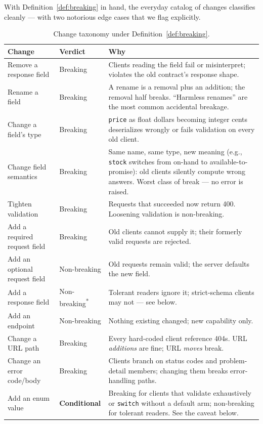 With Definition~\ref{def:breaking} in hand, the everyday catalog of changes
classifies cleanly --- with two notorious edge cases that we flag explicitly.

\begin{table}[ht]
  \centering
  \small
  \begin{tabularx}{\textwidth}{l l X}
    \toprule
    \textbf{Change} & \textbf{Verdict} & \textbf{Why} \\
    \midrule
    Remove a response field & Breaking & Clients reading the field fail or
      misinterpret; violates the old contract's response shape. \\
    Rename a field & Breaking & A rename is a removal plus an addition; the
      removal half breaks. ``Harmless renames'' are the most common
      accidental breakage. \\
    Change a field's type & Breaking & \texttt{price} as float dollars
      becoming integer cents deserializes wrongly or fails validation on
      every old client. \\
    Change field semantics & Breaking & Same name, same type, new meaning
      (e.g., \texttt{stock} switches from on-hand to available-to-promise):
      old clients silently compute wrong answers. Worst class of break ---
      no error is raised. \\
    Tighten validation & Breaking & Requests that succeeded now return 400.
      Loosening validation is non-breaking. \\
    Add a required request field & Breaking & Old clients cannot supply it;
      their formerly valid requests are rejected. \\
    Add an optional request field & Non-breaking & Old requests remain valid;
      the server defaults the new field. \\
    Add a response field & Non-breaking\textsuperscript{*} & Tolerant readers
      ignore it; strict-schema clients may not --- see below. \\
    Add an endpoint & Non-breaking & Nothing existing changed; new capability
      only. \\
    Change a URL path & Breaking & Every hard-coded client reference 404s.
      URL \emph{additions} are fine; URL \emph{moves} break. \\
    Change an error code/body & Breaking & Clients branch on status codes and
      problem-detail members; changing them breaks error-handling paths. \\
    Add an enum value & \textbf{Conditional} & Breaking for clients that
      validate exhaustively or \texttt{switch} without a default arm;
      non-breaking for tolerant readers. See the caveat below. \\
    \bottomrule
  \end{tabularx}
  \caption{Change taxonomy under Definition~\ref{def:breaking}.}
  \label{tab:ch9-taxonomy}
\end{table}


